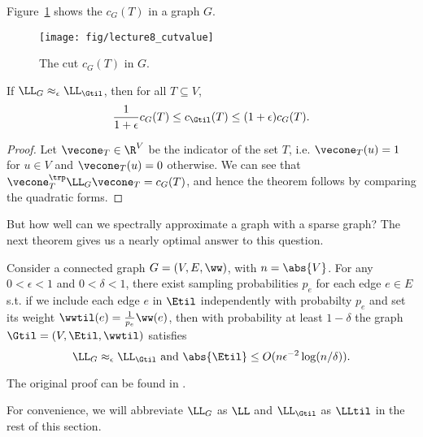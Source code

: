 Figure~\ref{fig:cutexample} shows the $c_G(T)$ in a graph $G$.
\begin{figure}[h]
  \centering
  \texttt{[image: fig/lecture8\_cutvalue]}
\caption{The cut $c_G(T)$ in $G$.}
\label{fig:cutexample}
\end{figure}


\begin{theorem}
  If $\LL_{G} \approx_{\epsilon} \LL_{\Gtil}$, then for all $T \subseteq V$,
  \[
    \frac{1}{1+\epsilon}   c_G(T) \leq   c_{\Gtil}(T) \leq (1+\epsilon)   c_G(T)
    .
    \]
\end{theorem}
\begin{proof}
  Let $\vecone_T \in \R^V$ be the indicator of the set $T$,
  i.e. $\vecone_T(u) = 1$ for $u \in V$ and $\vecone_T(u) = 0$
  otherwise.
  We can see that $\vecone_T^{\trp} \LL_{G} \vecone_T =  c_G(T)$, and
  hence the theorem follows by comparing the quadratic forms.
\end{proof}

But how well can we spectrally approximate a graph with a sparse graph? The next
theorem gives us a nearly optimal answer to this question.
\begin{theorem}
  \label{thm:spectralgraphapxbysamp}
Consider a connected graph $G = (V,E,\ww)$, with $n = \abs{V}$.
For any $0 < \epsilon < 1$
and $0 < \delta < 1$, there exist sampling probabilities $p_e$ for
each edge $e \in E$ s.t. if we include each edge $e$ in $\Etil$
independently with probabilty $p_e$ and set its weight $\wwtil(e) =
\frac{1}{p_e} \ww(e)$, then with probability at least $1-\delta$
the graph $\Gtil = (V,\Etil,\wwtil)$ satisfies
\[
  \LL_{G} \approx_{\epsilon} \LL_{\Gtil} \text{ and }  \abs{\Etil}
  \leq O( n \epsilon^{-2} \log(n/\delta) )
.
\]
\end{theorem}
The original proof can be found in \cite{spielman2011graph}.


\begin{remark}
  For convenience, we will abbreviate $\LL_{G}$ as $\LL$ and
  $\LL_{\Gtil}$ as $\LLtil$ in the rest of this section.
\end{remark}


